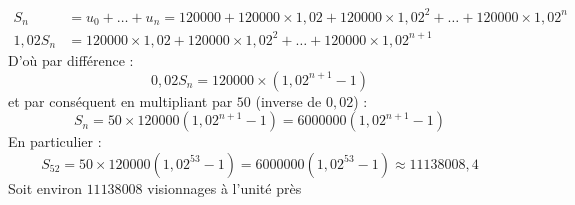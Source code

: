\begin{align*}
	S_n& = u_0 + \ldots + u_n = 120000 + 120000 \times 1,02 + 120000 \times 1,02^2 + \ldots + 120000 \times 1,02^n\\
	1,02 S_n& = 120000 \times 1,02 + 120000 \times 1,02^2 + \ldots + 120000 \times 1,02^{n+1}
\end{align*}
D’où par différence :
	$$	0,02 S_n = 120000 \times (1,02^{n+1} - 1) $$
	et par conséquent en multipliant par $50$ (inverse de $0,02$) :\\
	$$ S_n = 50 \times 120000 (1,02^{n+1} - 1) = 6000000 (1,02^{n+1} - 1)$$
En particulier :
	\[
	S_{52} = 50 \times 120000 (1,02^{53} - 1) = 6000000 (1,02^{53} - 1) \approx 11138008,4 	\]
	Soit environ $11 138 008$ visionnages à l’unité près
